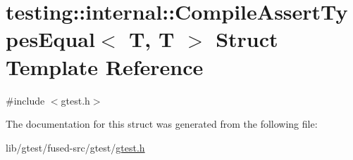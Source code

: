 \hypertarget{structtesting_1_1internal_1_1_compile_assert_types_equal_3_01_t_00_01_t_01_4}{\section{testing\-:\-:internal\-:\-:Compile\-Assert\-Types\-Equal$<$ T, T $>$ Struct Template Reference}
\label{structtesting_1_1internal_1_1_compile_assert_types_equal_3_01_t_00_01_t_01_4}
}


{\ttfamily \#include $<$gtest.\-h$>$}



The documentation for this struct was generated from the following file\-:\begin{DoxyCompactItemize}
\item 
lib/gtest/fused-\/src/gtest/\hyperlink{fused-src_2gtest_2gtest_8h}{gtest.\-h}\end{DoxyCompactItemize}
